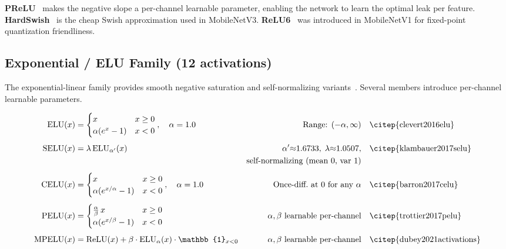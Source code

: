 \noindent\textbf{PReLU}~\citep{he2015prelu} makes the negative slope a
per-channel learnable parameter, enabling the network to learn the optimal
leak per feature. \textbf{HardSwish}~\citep{howard2019hardswish} is the cheap
Swish approximation used in MobileNetV3. \textbf{ReLU6}~\citep{howard2017mobile}
was introduced in MobileNetV1 for fixed-point quantization friendliness.

\subsection{Exponential / ELU Family (12 activations)}

The exponential-linear family provides smooth negative saturation and
self-normalizing variants~\citep{clevert2016elu,klambauer2017selu,dubey2021activations}.
Several members introduce per-channel learnable parameters.

\begin{align}
  \text{ELU}(x) &= \begin{cases} x & x\ge 0 \\ \alpha(e^{x}-1) & x<0 \end{cases},
    \quad \alpha=1.0
    & \text{Range: } (-\alpha,\infty)
    & \quad \text{\citep{clevert2016elu}} \\[4pt]
  \text{SELU}(x) &= \lambda\,\text{ELU}_{\alpha'}(x)
    & \alpha'{\approx}1.6733,\;\lambda{\approx}1.0507,
    & \quad \text{\citep{klambauer2017selu}} \\
  & & \text{self-normalizing (mean 0, var 1)} & \notag \\[4pt]
  \text{CELU}(x) &= \begin{cases} x & x\ge 0 \\ \alpha(e^{x/\alpha}-1) & x<0 \end{cases},
    \quad \alpha=1.0
    & \text{Once-diff.\ at 0 for any } \alpha
    & \quad \text{\citep{barron2017celu}} \\[4pt]
  \text{PELU}(x) &= \begin{cases} \tfrac{\alpha}{\beta}\,x & x\ge 0 \\
    \alpha(e^{x/\beta}-1) & x<0 \end{cases}
    & \alpha,\beta\text{ learnable per-channel}
    & \quad \text{\citep{trottier2017pelu}} \\[4pt]
  \text{MPELU}(x) &= \text{ReLU}(x)+\beta\cdot\text{ELU}_{\alpha}(x)\cdot\mathbb{1}_{x<0}
    & \alpha,\beta\text{ learnable per-channel}
    & \quad \text{\citep{dubey2021activations}}
\end{align}

